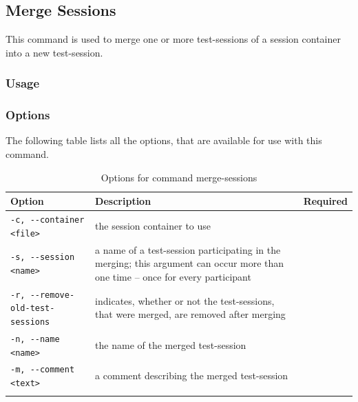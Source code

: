 \subsection{Merge Sessions}\label{Command-Merge-Sessions}
This command is used to merge one or more test-sessions of a session container into a new test-session.
\subsubsection{Usage}\label{command:ms:usage}
\begin{quote}
\end{quote}

\subsubsection{Options}\label{command:ms:options}
The following table lists all the options, that are available for use with this command.
\begin{longtable}{|l|p{4cm}|c|}\hline
   {\textbf{Option}} & 
   {\textbf{Description}} & 
   {\textbf{Required}} \\\hline \hline \endhead
   \verb$-c, --container <file>$ & the session container to use & \x \\\hline
   \verb$-s, --session <name>$ & a name of a test-session participating in the merging; this argument can occur more than one time -- once for every participant & \x \\\hline
   \verb$-r, --remove-old-test-sessions$ & indicates, whether or not the test-sessions, that were merged, are removed after merging & \\\hline
   \verb$-n, --name <name>$ & the name of the merged test-session & \x \\\hline
   \verb$-m, --comment <text>$ & a comment describing the merged test-session & \\\hline
  \caption{Options for command merge-sessions}
  \label{fr_tb:Options for command merge-sessions}
\end{longtable}

